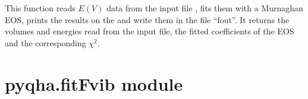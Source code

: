 \documentclass[letterpaper,10pt,english]{sphinxmanual}
\begin{document}

\begin{fulllineitems}
This function reads \(E(V)\) data from the input file , fits them with a Murnaghan EOS,
prints the results on the  and write them in the file ``fout''.
It returns the volumes and energies read from the input file, the fitted coefficients 
of the EOS and the corresponding \(\chi^2\).

\end{fulllineitems}



\section{pyqha.fitFvib module}
\label{pyqha:pyqha-fitfvib-module}\label{pyqha:module-pyqha.fitFvib}
\end{document}
